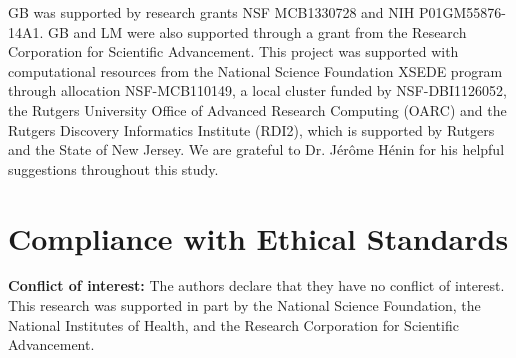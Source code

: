 \begin{acknowledgements}
GB was supported by research grants NSF MCB1330728 and NIH P01GM55876-14A1. GB and LM were also supported through a grant from the Research Corporation for Scientific Advancement. This project was supported with computational resources from the National Science Foundation XSEDE program through allocation NSF-MCB110149, a local cluster funded by NSF-DBI1126052, the Rutgers University Office of Advanced Research Computing (OARC) and the Rutgers Discovery Informatics Institute (RDI2), which is supported by Rutgers and the State of New Jersey. We are grateful to Dr. J\'{e}r\^{o}me H\'{e}nin for his helpful suggestions throughout this study.  
\end{acknowledgements}


%
%

\section{Compliance with Ethical Standards}
{\bf Conflict of interest:} The authors declare that they have no conflict of interest. This research was supported in part by the National Science Foundation, the National Institutes of Health, and the Research Corporation for Scientific Advancement. 





